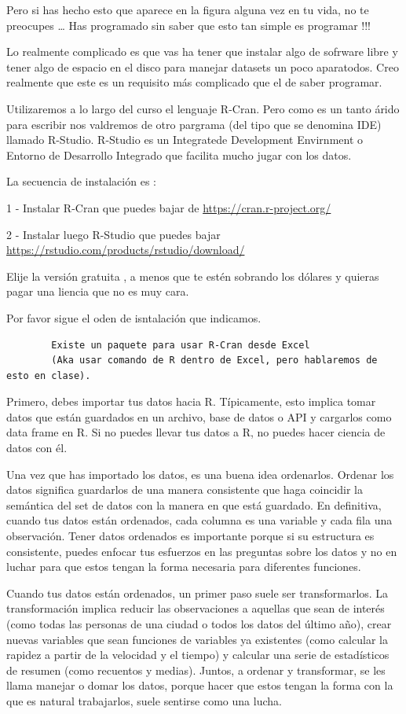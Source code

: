 \documentclass[]{article}
\begin{document}
Pero si has hecho esto que aparece en la figura alguna vez en tu vida,
no te preocupes \ldots{} Has programado sin saber que esto tan simple es
programar !!!

Lo realmente complicado es que vas ha tener que instalar algo de
sofrware libre y tener algo de espacio en el disco para manejar datasets
un poco aparatodos. Creo realmente que este es un requisito más
complicado que el de saber programar.

Utilizaremos a lo largo del curso el lenguaje R-Cran. Pero como es un
tanto árido para escribir nos valdremos de otro pargrama (del tipo que
se denomina IDE) llamado R-Studio. R-Studio es un Integratede
Development Envirnment o Entorno de Desarrollo Integrado que facilita
mucho jugar con los datos.

La secuencia de instalación es :

1 - Instalar R-Cran que puedes bajar de
\url{https://cran.r-project.org/}

2 - Instalar luego R-Studio que puedes bajar
\url{https://rstudio.com/products/rstudio/download/}

Elije la versión gratuita , a menos que te estén sobrando los dólares y
quieras pagar una liencia que no es muy cara.

Por favor sigue el oden de isntalación que indicamos.

\begin{verbatim}
        Existe un paquete para usar R-Cran desde Excel 
        (Aka usar comando de R dentro de Excel, pero hablaremos de esto en clase).
\end{verbatim}

Primero, debes importar tus datos hacia R. Típicamente, esto implica
tomar datos que están guardados en un archivo, base de datos o API y
cargarlos como data frame en R. Si no puedes llevar tus datos a R, no
puedes hacer ciencia de datos con él.

Una vez que has importado los datos, es una buena idea ordenarlos.
Ordenar los datos significa guardarlos de una manera consistente que
haga coincidir la semántica del set de datos con la manera en que está
guardado. En definitiva, cuando tus datos están ordenados, cada columna
es una variable y cada fila una observación. Tener datos ordenados es
importante porque si su estructura es consistente, puedes enfocar tus
esfuerzos en las preguntas sobre los datos y no en luchar para que estos
tengan la forma necesaria para diferentes funciones.

Cuando tus datos están ordenados, un primer paso suele ser
transformarlos. La transformación implica reducir las observaciones a
aquellas que sean de interés (como todas las personas de una ciudad o
todos los datos del último año), crear nuevas variables que sean
funciones de variables ya existentes (como calcular la rapidez a partir
de la velocidad y el tiempo) y calcular una serie de estadísticos de
resumen (como recuentos y medias). Juntos, a ordenar y transformar, se
les llama manejar o domar los datos, porque hacer que estos tengan la
forma con la que es natural trabajarlos, suele sentirse como una lucha.
\end{document}
